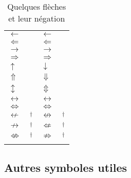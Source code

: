 \begin{table}[p]
  \caption{Quelques flèches et leur négation}
  \label{tab:math:fleches}
  \begin{tabularx}{1.0\linewidth}{lXlX}
    $\gets$                & \cmd{\leftarrow}\quad \cmd{\gets} &
    $\longleftarrow$       & \cmd{\longleftarrow}              \\
    $\Leftarrow$           & \cmd{\Leftarrow}                  &
    $\Longleftarrow$       & \cmd{\Longleftarrow}              \\
    $\to$                  & \cmd{\rightarrow}\quad \cmd{\to}  &
    $\longrightarrow$      & \cmd{\longrightarrow}             \\
    $\Rightarrow$          & \cmd{\Rightarrow}                 &
    $\Longrightarrow$      & \cmd{\Longrightarrow}             \\
    $\uparrow$             & \cmd{\uparrow}                    &
    $\downarrow$           & \cmd{\downarrow}                  \\
    $\Uparrow$             & \cmd{\Uparrow}                    &
    $\Downarrow$           & \cmd{\Downarrow}                  \\
    $\updownarrow$         & \cmd{\updownarrow}                &
    $\Updownarrow$         & \cmd{\Updownarrow}                \\
    $\leftrightarrow$      & \cmd{\leftrightarrow}             &
    $\longleftrightarrow$  & \cmd{\longleftrightarrow}         \\
    $\Leftrightarrow$      & \cmd{\Leftrightarrow}             &
    $\Longleftrightarrow$  & \cmd{\Longleftrightarrow}         \\
    $\nleftarrow$          & \cmd{\nleftarrow}$^\dagger$         &
    $\nleftrightarrow$     & \cmd{\nleftrightarrow}$^\dagger$    \\
    $\nrightarrow$         & \cmd{\nrightarrow}$^\dagger$        &
    $\nLeftarrow$          & \cmd{\nLeftarrow}$^\dagger$         \\
    $\nLeftrightarrow$     & \cmd{\nLeftrightarrow}$^\dagger$    &
    $\nRightarrow$         & \cmd{\nRightarrow}$^\dagger$        \\
    \addlinespace
  \end{tabularx}
\end{table}

\subsection{Autres symboles utiles}
\label{sec:math:symboles:autres}

